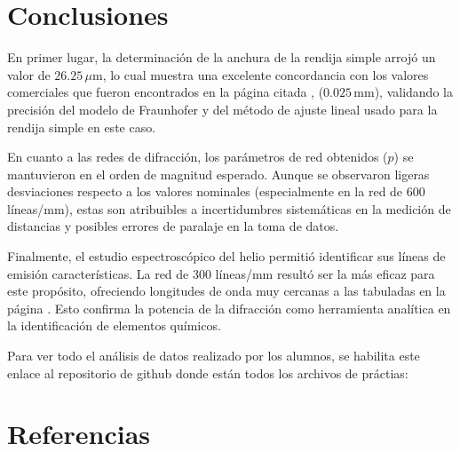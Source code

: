 \documentclass[11pt, a4paper, twocolumn]{article}
\begin{document}
\section{Conclusiones}
En primer lugar, la determinación de la anchura de la rendija simple arrojó un valor de $26.25\,\mu\text{m}$, lo cual muestra una excelente 
concordancia con los valores comerciales que fueron encontrados en la página citada \cite{ventus_rendijas}, ($0.025\,\text{mm}$), validando la precisión del modelo de Fraunhofer y 
del método de ajuste lineal usado para la rendija simple en este caso.

En cuanto a las redes de difracción, los parámetros de red obtenidos ($p$) se mantuvieron en el orden de magnitud esperado. 
Aunque se observaron ligeras desviaciones respecto a los valores nominales (especialmente en la red de 600 líneas/mm), estas son atribuibles a incertidumbres sistemáticas en 
la medición de distancias y posibles errores de paralaje en la toma de datos.

Finalmente, el estudio espectroscópico del helio permitió identificar sus líneas de emisión características. La red de 300 líneas/mm resultó ser la más eficaz para este propósito, ofreciendo longitudes de onda muy cercanas a las tabuladas
en la página \cite{espectro_helio}. Esto confirma la potencia de la difracción como herramienta analítica en la identificación de elementos químicos. 


\vspace{0.5cm}
Para ver todo el análisis de datos realizado por los alumnos, se habilita este enlace al repositorio de github donde están todos los archivos de práctias: 
\cite{2026experimental}

\section{Referencias}

\printbibliography
\end{document}
